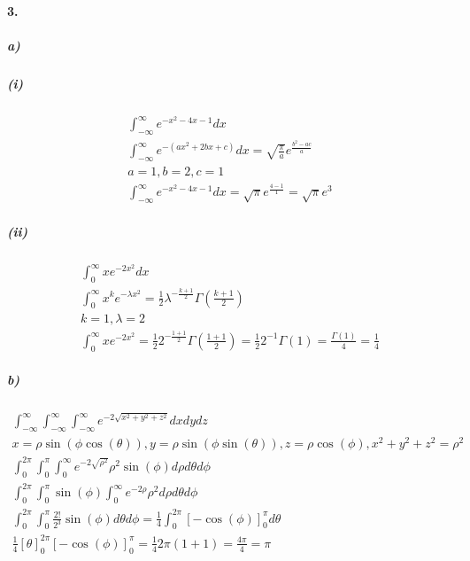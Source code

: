 \documentclass[11pt, A4paper,norsk]{article}
\begin{document}
		\paragraph{3.}
			\subparagraph{a)}
				\subparagraph{(i)}
					\begin{gather}
\int_{-\infty}^{\infty} e^{-x^{2} - 4x - 1} dx \\
\int_{-\infty}^{\infty} e^{-(ax^{2} + 2bx + c)} dx = \sqrt{\frac{\pi}{a}} e^{\frac{b^{2} - ac}{a}} \\
a = 1, b = 2, c = 1 \\
\int_{-\infty}^{\infty} e^{-x^{2} - 4x - 1} dx = \sqrt{\pi} e^{\frac{4 - 1}{1}} = \sqrt{\pi} e^{3}
					\end{gather}









				\subparagraph{(ii)}
					\begin{gather}
\int_{0}^{\infty} xe^{-2x^{2}} dx \\
\int_{0}^{\infty} x^{k} e^{-\lambda x^{2}} = \frac{1}{2} \lambda^{-\frac{k + 1}{2}} \Gamma \left(\frac{k + 1}{2}\right) \\
k = 1, \lambda = 2 \\
\int_{0}^{\infty} x e^{-2 x^{2}} = \frac{1}{2} 2^{-\frac{1 + 1}{2}} \Gamma \left(\frac{1 + 1}{2}\right) = \frac{1}{2} 2^{-1} \Gamma (1) = \frac{\Gamma (1)}{4} = \frac{1}{4}
					\end{gather}










			\subparagraph{b)}
				\begin{gather}
\int_{-\infty}^{\infty} \int_{-\infty}^{\infty} \int_{-\infty}^{\infty} e^{-2\sqrt{x^{2} + y^{2} + z^{2}}}dxdydz \\
x = \rho\sin(\phi\cos(\theta)), y = \rho\sin(\phi\sin(\theta)), z = \rho\cos(\phi), x^{2} + y^{2} + z^{2} = \rho^{2} \\
\int_{0}^{2\pi} \int_{0}^{\pi} \int_{0}^{\infty} e^{-2\sqrt{\rho^{2}}} \rho^{2} \sin(\phi) d\rho d\theta d\phi \\
\int_{0}^{2\pi} \int_{0}^{\pi} \sin(\phi)  \int_{0}^{\infty} e^{-2\rho} \rho^{2} d\rho d\theta d\phi \\
\int_{0}^{2\pi} \int_{0}^{\pi} \frac{2!}{2^{3}} \sin(\phi) d\theta d\phi = \frac{1}{4} \int_{0}^{2\pi} [-\cos(\phi)]_{0}^{\pi} d\theta \\
\frac{1}{4} \left[ \theta \right]_{0}^{2\pi} [-\cos(\phi)]_{0}^{\pi} = \frac{1}{4} 2\pi (1 + 1) = \frac{4 \pi}{4} = \pi
				\end{gather}
\end{document}
